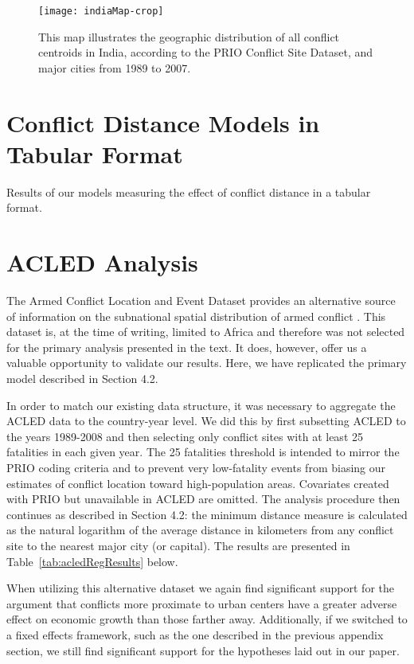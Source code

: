 \documentclass[12pt,onesided]{amsart}
\begin{document}
\begin{figure}[ht]
	\centering
	\texttt{[image: indiaMap-crop]}
	\caption{This map illustrates the geographic distribution of all conflict centroids in India, according to the PRIO Conflict Site Dataset, and major cities from 1989 to 2007. }
	\label{fig:indiaMap}
\end{figure}
\FloatBarrier

\clearpage
\section{Conflict Distance Models in Tabular Format}

Results of our models measuring the effect of conflict distance in a tabular format.  



\clearpage
\section{ACLED Analysis}
\label{acled}

The Armed Conflict Location and Event Dataset provides an alternative source of information on the subnational spatial distribution of armed conflict \citep{raleigh:linke:etal:2010}. This dataset is, at the time of writing, limited to Africa and therefore was not selected for the primary analysis presented in the text. It does, however, offer us a valuable opportunity to validate our results. Here, we have replicated the primary model described in Section 4.2.

In order to match our existing data structure, it was necessary to aggregate the ACLED data to the country-year level. We did this by first subsetting ACLED to the years 1989-2008 and then selecting only conflict sites with at least 25 fatalities in each given year. The 25 fatalities threshold is intended to mirror the PRIO coding criteria and to prevent very low-fatality events from biasing our estimates of conflict location toward high-population areas. Covariates created with PRIO but unavailable in ACLED are omitted. The analysis procedure then continues as described in Section 4.2: the minimum distance measure is calculated as the natural logarithm of the average distance in kilometers from any conflict site to the nearest major city (or capital). The results are presented in Table~\ref{tab:acledRegResults} below. 

When utilizing this alternative dataset we again find significant support for the argument that conflicts more proximate to urban centers have a greater adverse effect on economic growth than those farther away. Additionally, if we switched to a fixed effects framework, such as the one described in the previous appendix section, we still find significant support for the hypotheses laid out in our paper.
\end{document}
